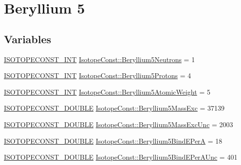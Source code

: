 \hypertarget{group___isotope_const-_beryllium-_be5}{}\section{Beryllium 5}
\label{group___isotope_const-_beryllium-_be5}
\subsection*{Variables}
\begin{DoxyCompactItemize}
\item 
\mbox{\hyperlink{group___isotope_const-_macros_ga5f18360b3e99483a35c32d789e62621c}{I\+S\+O\+T\+O\+P\+E\+C\+O\+N\+S\+T\+\_\+\+I\+NT}} \mbox{\hyperlink{group___isotope_const-_beryllium-_be5_ga43400ac0a7615de178a2188fb198ef39}{Isotope\+Const\+::\+Beryllium5\+Neutrons}} = 1
\item 
\mbox{\hyperlink{group___isotope_const-_macros_ga5f18360b3e99483a35c32d789e62621c}{I\+S\+O\+T\+O\+P\+E\+C\+O\+N\+S\+T\+\_\+\+I\+NT}} \mbox{\hyperlink{group___isotope_const-_beryllium-_be5_ga50c0298b5b1e90195055f0e5f4f02217}{Isotope\+Const\+::\+Beryllium5\+Protons}} = 4
\item 
\mbox{\hyperlink{group___isotope_const-_macros_ga5f18360b3e99483a35c32d789e62621c}{I\+S\+O\+T\+O\+P\+E\+C\+O\+N\+S\+T\+\_\+\+I\+NT}} \mbox{\hyperlink{group___isotope_const-_beryllium-_be5_ga7bb914d70f2d4cbec5f8c80e954dd186}{Isotope\+Const\+::\+Beryllium5\+Atomic\+Weight}} = 5
\item 
\mbox{\hyperlink{group___isotope_const-_macros_ga8f45a7272ce02c0b4c65c44636ed719a}{I\+S\+O\+T\+O\+P\+E\+C\+O\+N\+S\+T\+\_\+\+D\+O\+U\+B\+LE}} \mbox{\hyperlink{group___isotope_const-_beryllium-_be5_ga06f58273efc624187051d003f773e8f7}{Isotope\+Const\+::\+Beryllium5\+Mass\+Exc}} = 37139
\item 
\mbox{\hyperlink{group___isotope_const-_macros_ga8f45a7272ce02c0b4c65c44636ed719a}{I\+S\+O\+T\+O\+P\+E\+C\+O\+N\+S\+T\+\_\+\+D\+O\+U\+B\+LE}} \mbox{\hyperlink{group___isotope_const-_beryllium-_be5_ga226d2bb5a09cac0335111d962e026a82}{Isotope\+Const\+::\+Beryllium5\+Mass\+Exc\+Unc}} = 2003
\item 
\mbox{\hyperlink{group___isotope_const-_macros_ga8f45a7272ce02c0b4c65c44636ed719a}{I\+S\+O\+T\+O\+P\+E\+C\+O\+N\+S\+T\+\_\+\+D\+O\+U\+B\+LE}} \mbox{\hyperlink{group___isotope_const-_beryllium-_be5_ga8de9a707bd05af18e31311193919b0e4}{Isotope\+Const\+::\+Beryllium5\+Bind\+E\+PerA}} = 18
\item 
\mbox{\hyperlink{group___isotope_const-_macros_ga8f45a7272ce02c0b4c65c44636ed719a}{I\+S\+O\+T\+O\+P\+E\+C\+O\+N\+S\+T\+\_\+\+D\+O\+U\+B\+LE}} \mbox{\hyperlink{group___isotope_const-_beryllium-_be5_gaea3a02c0c859f298d85bd34cbfe6ce53}{Isotope\+Const\+::\+Beryllium5\+Bind\+E\+Per\+A\+Unc}} = 401

\end{DoxyCompactItemize}
